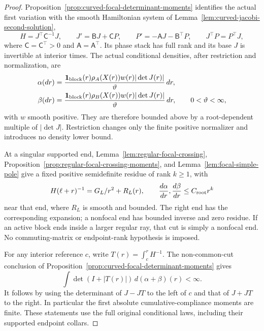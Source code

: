 \documentclass[11pt,reqno]{amsart}
\theoremstyle{definition}
\theoremstyle{remark}
\numberwithin{equation}{section}
\begin{document}
\begin{proof}
Proposition~\ref{prop:curved-focal-determinant-moments} identifies
the actual first variation with the smooth Hamiltonian system of
Lemma~\ref{lem:curved-jacobi-second-solution},
\[
 H=J^\top\mathsf C^{-1}J,\qquad
 J'=\mathsf BJ+\mathsf CP,\qquad
 P'=-\mathsf AJ-\mathsf B^\top P,
 \qquad J^\top P=P^\top J,
\]
where \(\mathsf C=\mathsf C^\top>0\) and
\(\mathsf A=\mathsf A^\top\). Its phase stack has full rank and
its base \(J\) is invertible at interior times. The actual conditional
densities, after restriction and normalization, are
\begin{equation}
 \begin{split}
 \alpha(dr)&=\frac{\mathbf1_{\rm block}(r)
      \rho_A(X(r))w(r)|\det J(r)|}{\vartheta}\,dr,\\
 \beta(dr)&=\frac{\mathbf1_{\rm block}(r)
      \rho_B(X(r))w(r)|\det J(r)|}{\vartheta}\,dr,
              \qquad 0<\vartheta<\infty,
 \end{split}
 \label{eq:interleaved-root-density}
\end{equation}
with \(w\) smooth positive. They are therefore bounded above by a
root-dependent multiple of \(|\det J|\). Restriction changes only
the finite positive normalizer and introduces no density lower bound.

At a singular supported end,
Lemma~\ref{lem:regular-focal-crossing},
Proposition~\ref{prop:regular-focal-crossing-moments}, and
Lemma~\ref{lem:focal-simple-pole} give a fixed positive semidefinite
residue of rank \(k\ge1\), with
\[
 H(\ell+r)^{-1}=G_L/r^2+R_L(r),\qquad
 \frac{d\alpha}{dr},\frac{d\beta}{dr}\le C_{\rm root}r^k
\]
near that end, where \(R_L\) is smooth and bounded. The right end
has the corresponding expansion; a nonfocal end has bounded inverse
and zero residue. If an active block ends inside a larger regular
ray, that cut is simply a nonfocal end. No commuting-matrix or
endpoint-rank hypothesis is imposed.

For any interior reference \(c\), write
\(T(r)=\int_c^r H^{-1}\). The non-common-cut conclusion of
Proposition~\ref{prop:curved-focal-determinant-moments} gives
\begin{equation}
 \int\det(I+|T(r)|)\,d(\alpha+\beta)(r)<\infty.
 \label{eq:interleaved-root-moment}
\end{equation}
It follows by using the determinant of \(J-JT\) to the left of
\(c\) and that of \(J+JT\) to the right. In particular the first
absolute cumulative-compliance moments are finite. These statements
use the full original conditional laws, including their supported
endpoint collars.


\end{proof}
\end{document}
